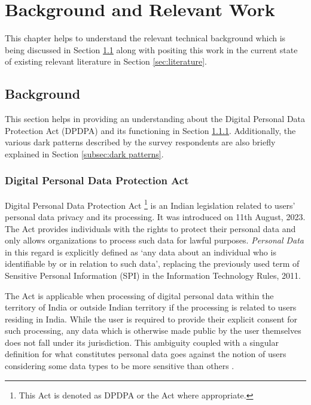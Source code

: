 \chapter{Background and Relevant Work} \label{chapter:background&works}

This chapter helps to understand the relevant technical background which is being discussed in Section \ref{sec:background} along with positing this work in the current state of existing relevant literature in Section \ref{sec:literature}.

\section{Background} \label{sec:background}
This section helps in providing an understanding about the Digital Personal Data Protection Act (DPDPA) and its functioning in Section \ref{subsec:DPDPA explanation}. Additionally, the various dark patterns described by the survey respondents are also briefly explained in Section \ref{subsec:dark patterns}.

\subsection{Digital Personal Data Protection Act} \label{subsec:DPDPA explanation}

Digital Personal Data Protection Act \footnote{This Act is denoted as DPDPA or the Act where appropriate.} is an Indian legislation related to users' personal data privacy and its processing. It was introduced on 11th August, 2023. The Act provides individuals with the rights to protect their personal data and only allows organizations to process such data for lawful purposes. \textit{Personal Data} in this regard is explicitly defined as `any data about an individual who is identifiable by or in relation to such data', replacing the previously used term of Sensitive Personal Information (SPI) in the Information Technology Rules, 2011. 

The Act is applicable when processing of digital personal data within the territory of India or outside Indian territory if the processing is related to users residing in India. While the user is required to provide their explicit consent for such processing, any data which is otherwise made public by the user themselves does not fall under its jurisdiction. This ambiguity coupled with a singular definition for what constitutes personal data goes against the notion of users considering some data types to be more sensitive than others \cite{danezis_privacy_2006, kumaraguru_privacy_2012}. 


